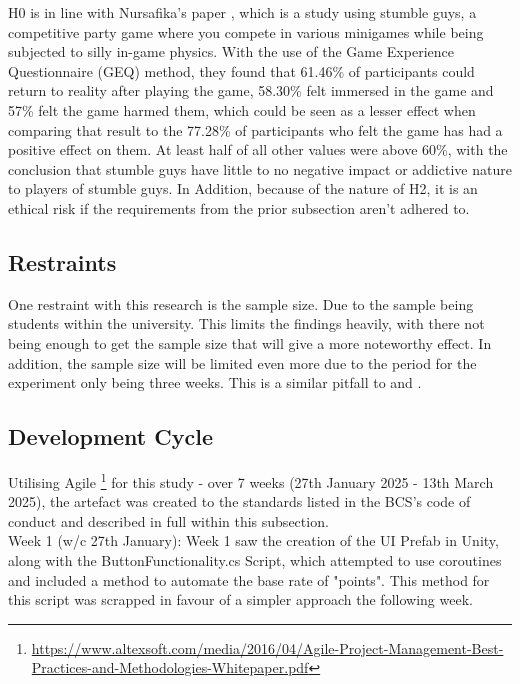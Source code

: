 \documentclass[conference]{IEEEtran}
\begin{document}
H0 is in line with Nursafika's paper \cite{Nursafika2024}, which is a study using stumble guys, a competitive party game where you compete in various minigames while being subjected to silly in-game physics. With the use of the Game Experience Questionnaire (GEQ) method, they found that 61.46\% of participants could return to reality after playing the game, 58.30\% felt immersed in the game and 57\% felt the game harmed them, which could be seen as a lesser effect when comparing that result to the 77.28\% of participants who felt the game has had a positive effect on them. At least half of all other values were above 60\%,  with the conclusion that stumble guys have little to no negative impact or addictive nature to players of stumble guys. In Addition, because of the nature of H2, it is an ethical risk if the requirements from the prior subsection aren't adhered to.

\subsection {Restraints}
One restraint with this research is the sample size. Due to the sample being students within the university. This limits the findings heavily, with there not being enough to get the sample size that will give a more noteworthy effect. In addition, the sample size will be limited even more due to the period for the experiment only being three weeks. This is a similar pitfall to \cite{Naaj2021} and \cite{Ruqeyya2022}.\\

\subsection{Development Cycle}
Utilising Agile \footnote{\url{https://www.altexsoft.com/media/2016/04/Agile-Project-Management-Best-Practices-and-Methodologies-Whitepaper.pdf}} for this study - over 7 weeks (27th January 2025 - 13th March 2025), the artefact was created to the standards listed in the BCS's code of conduct and described in full within this subsection.\\


Week 1 (w/c 27th January): 
Week 1 saw the creation of the UI Prefab in Unity, along with the ButtonFunctionality.cs Script, which attempted to use coroutines and included a method to automate the base rate of "points". This method for this script was scrapped in favour of a simpler approach the following week.\\
\end{document}
